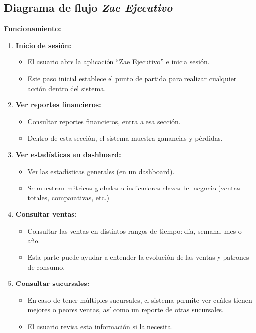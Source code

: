 \documentclass[protocolo.tex]{subfiles}
\begin{document}
\subsection{Diagrama de flujo \textit{Zae Ejecutivo}}
\textbf{Funcionamiento:}
\begin{enumerate}
    \item \textbf{Inicio de sesión: }  
    \begin{itemize}
        \item El usuario abre la aplicación “Zae Ejecutivo” e inicia sesión.
        \item Este paso inicial establece el punto de partida para realizar cualquier acción dentro del sistema.
        
    \end{itemize}
    \item \textbf{Ver reportes financieros:}  
    \begin{itemize}
        \item Consultar reportes financieros, entra a esa sección.
        \item Dentro de esta sección, el sistema muestra ganancias y pérdidas.
        
        
    \end{itemize}
    \item \textbf{Ver estadísticas en dashboard:}  
    \begin{itemize}
        \item Ver las estadísticas generales (en un dashboard).
        \item Se muestran métricas globales o indicadores claves del negocio (ventas totales, comparativas, etc.).
        
        
    \end{itemize}
    \item \textbf{Consultar ventas:} 
    \begin{itemize}
        \item Consultar las ventas en distintos rangos de tiempo: día, semana, mes o año.
        \item Esta parte puede ayudar a entender la evolución de las ventas y patrones de consumo.
        
        
    \end{itemize}
    \item \textbf{Consultar sucursales:} 
    \begin{itemize}
        \item En caso de tener múltiples sucursales, el sistema permite ver cuáles tienen mejores o peores ventas, así como un reporte de otras sucursales.
        \item El usuario revisa esta información si la necesita.
        

\end{itemize}
\end{enumerate}
\end{document}
